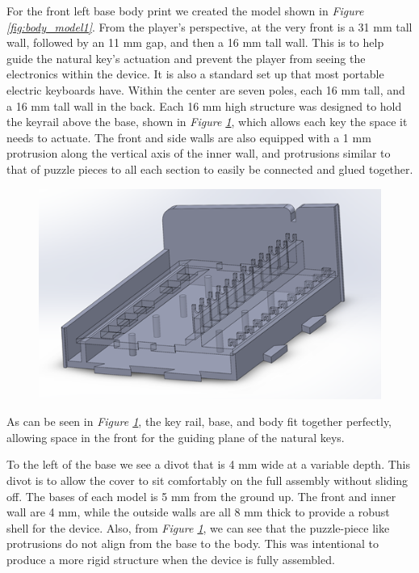 For the front left base body print we created the model shown in \textit{Figure \ref{fig:body_model1}}. From the player’s perspective, at the very front is a 31 mm tall wall, followed by an 11 mm gap, and then a 16 mm tall wall. This is to help guide the natural key’s actuation and prevent the player from seeing the electronics within the device. It is also a standard set up that most portable electric keyboards have. Within the center are seven poles, each 16 mm tall, and a 16 mm tall wall in the back. Each 16 mm high structure was designed to hold the keyrail above the base, shown in \textit{Figure \ref{fig:body_model2}}, which allows each key the space it needs to actuate. The front and side walls are also equipped with a 1 mm protrusion along the vertical axis of the inner wall, and protrusions similar to that of puzzle pieces to all each section to easily be connected and glued together.

\begin{figure}[h!]
  \centering
  \includegraphics[width=0.8\linewidth]{image/BodyModel2.png}
  \caption{}
  \label{fig:body_model2}
\end{figure}

As can be seen in \textit{Figure \ref{fig:body_model2}}, the key rail, base, and body fit together perfectly, allowing space in the front for the guiding plane of the natural keys.

To the left of the base we see a divot that is 4 mm wide at a variable depth. This divot is to allow the cover to sit comfortably on the full assembly without sliding off. The bases of each model is 5 mm from the ground up. The front and inner wall are 4 mm, while the outside walls are all 8 mm thick to provide a robust shell for the device. Also, from \textit{Figure \ref{fig:body_model2}}, we can see that the puzzle-piece like protrusions do not align from the base to the body. This was intentional to produce a more rigid structure when the device is fully assembled.

